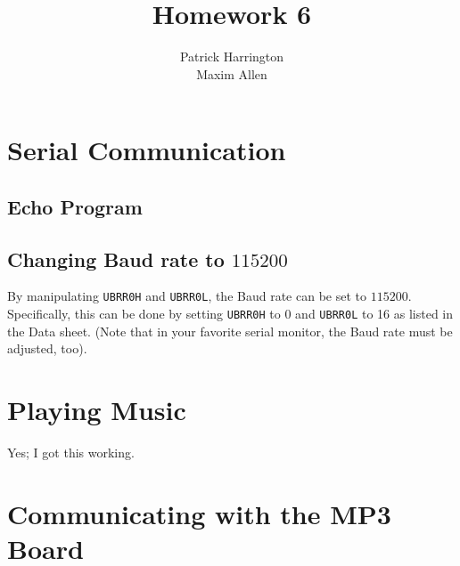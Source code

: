 \documentclass{hw}
\title{Homework 6}
\author{Patrick Harrington\\Maxim Allen}
\begin{document}
\maketitle

\section{Serial Communication}

\subsection{Echo Program}


  

\subsection{Changing Baud rate to $115200$}

By manipulating \texttt{UBRR0H} and \texttt{UBRR0L}, the Baud rate
can be set to $115200$. Specifically, this can be done by setting \texttt{UBRR0H} to 0 and
\texttt{UBRR0L} to 16 as listed in the Data sheet. (Note that in
your favorite serial monitor, the Baud rate must be adjusted, too).

\section{Playing Music}
Yes; I got this working.
\section{Communicating with the MP3 Board}

  
\end{document}
